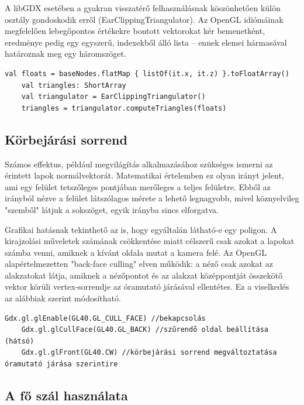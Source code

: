A libGDX esetében a gyakran visszatérő felhasználásnak köszönhetően külön osztály gondoskodik erről (EarClippingTriangulator). Az OpenGL idiómáinak megfelelően lebegőpontos értékekre bontott vektorokat kér bemenetként, eredménye pedig egy egyszerű, indexekből álló lista -- ennek elemei hármasával határoznak meg egy háromszöget.

\begin{lstlisting}[caption=Példa az EarClippingTriangulator felhasználására]
    val floats = baseNodes.flatMap { listOf(it.x, it.z) }.toFloatArray()
    val triangles: ShortArray
    val triangulator = EarClippingTriangulator()
    triangles = triangulator.computeTriangles(floats)
\end{lstlisting}

\subsection{Körbejárási sorrend}

Számos effektus, például megvilágítás alkalmazásához szükséges ismerni az érintett lapok normálvektorát. Matematikai értelemben ez olyan irányt jelent, ami egy felület tetszőleges pontjában merőleges a teljes felületre. Ebből az irányból nézve a felület látszólagos mérete a lehető legnagyobb, mivel köznyelvileg "szemből" látjuk a sokszöget, egyik irányba sincs elforgatva.

Grafikai hatásnak tekinthető az is, hogy egyáltalán látható-e egy poligon. A kirajzolási műveletek számának csökkentése miatt célszerű csak azokat a lapokat számba venni, amiknek a kívánt oldala mutat a kamera felé. Az OpenGL alapértelmezetten "back-face culling" elven működik: a néző csak azokat az alakzatokat látja, amiknek a nézőpontot és az alakzat középpontját összekötő vektor körüli vertex-sorrendje az óramutató járásával ellentétes. Ez a viselkedés az alábbiak szerint módosítható.

\begin{lstlisting}[caption=Példa az OpenGL culling műveleteinek beállításaira libGDX-en keresztül]
    Gdx.gl.glEnable(GL40.GL_CULL_FACE) //bekapcsolás
    Gdx.gl.glCullFace(GL40.GL_BACK) //szűrendő oldal beállítása (hátsó)
    Gdx.gl.glFront(GL40.CW) //körbejárási sorrend megváltoztatása óramutató járása szerintire
\end{lstlisting}

\subsection{A fő szál használata}

